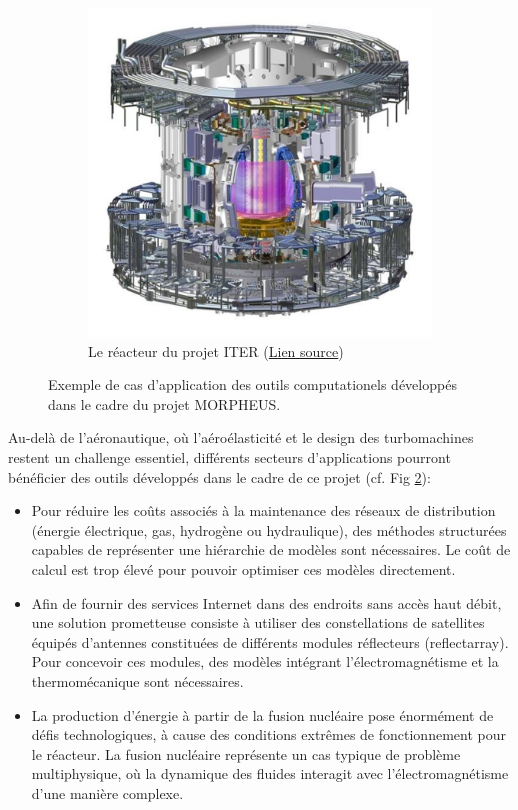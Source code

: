 \documentclass[french]{article}
\begin{document}
\begin{figure}[t]
\begin{subfigure}[t]{0.25\textwidth}
		\includegraphics[width=\columnwidth]{tcws.jpg}%
		\caption{Le réacteur du projet ITER (\href{https://www.iter.org/newsline/-/1119}{Lien source})}
		\label{fig:sofi-mit}
	\end{subfigure}
	\caption[]{Exemple de cas d’application des outils computationels développés dans le cadre du projet MORPHEUS.}%
	\label{fig:applications}%
\end{figure}

Au-delà de l’aéronautique, où l’aéroélasticité et le design des turbomachines restent un challenge essentiel, différents secteurs d’applications pourront bénéficier des outils développés
dans le cadre de ce projet (cf. Fig \ref{fig:applications}): \\
\begin{itemize}
	\item Pour réduire les coûts associés à la maintenance des réseaux de distribution (énergie
	électrique, gas, hydrogène ou hydraulique), des méthodes structurées capables de représenter une hiérarchie de modèles sont nécessaires. Le coût de calcul est trop élevé pour pouvoir optimiser ces modèles directement.
	\item Afin de fournir des services Internet dans des endroits sans accès haut débit, une
	solution prometteuse consiste à utiliser des constellations de satellites équipés d'antennes constituées de différents modules réflecteurs (reflectarray). Pour concevoir ces modules, des modèles intégrant l’électromagnétisme et la thermomécanique sont nécessaires.
	\item  La production d’énergie à partir de la fusion nucléaire pose énormément de défis
	technologiques, à cause des conditions extrêmes de fonctionnement pour le réacteur. La fusion nucléaire représente un cas typique de problème multiphysique, où la dynamique des fluides interagit avec l’électromagnétisme d’une manière complexe.
\end{itemize}
\end{document}
